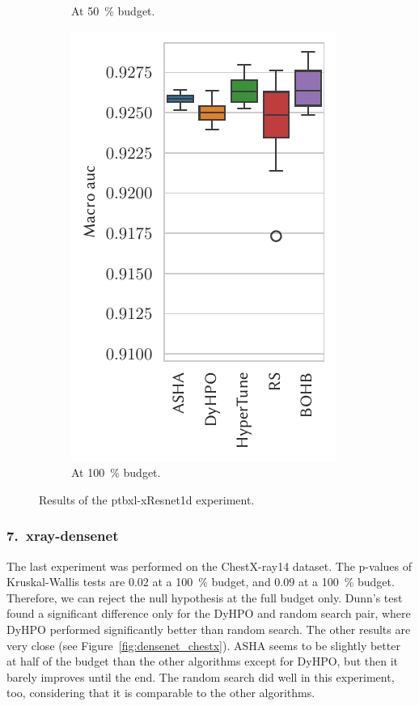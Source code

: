 \begin{figure}[H]
\begin{subfigure}{.26\textwidth}
        \caption{At \SI{50}{\percent} budget.}%
    \end{subfigure}%
    \begin{subfigure}{.26\textwidth}
        \includegraphics[height=\plotheight]{img/real_exp/ptbxl_xResNet1d_boxplot_full.pdf}%
        \caption{At \SI{100}{\percent} budget.}%
    \end{subfigure}%
\caption{Results of the ptbxl-xResnet1d experiment.}
\label{fig:xresnet_ptbxl}
\end{figure}


\subsubsection{7.\ xray-densenet}
The last experiment was performed on the ChestX-ray14 dataset. The p-values of Kruskal-Wallis tests are $0.02$ at a \SI{100}{\percent} budget, and $0.09$ at a \SI{100}{\percent} budget. Therefore, we can reject the null hypothesis at the full budget only. Dunn's test found a significant difference only for the DyHPO and random search pair, where DyHPO performed significantly better than random search. The other results are very close (see Figure~\ref{fig:densenet_chestx}). ASHA seems to be slightly better at half of the budget than the other algorithms except for DyHPO, but then it barely improves until the end. The random search did well in this experiment, too, considering that it is comparable to the other algorithms.


